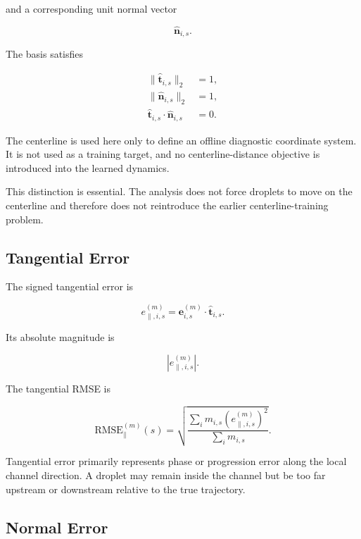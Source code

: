 \documentclass[11pt]{article}
\newcommand{\that}{\hat{\mathbf{t}}}
\newcommand{\nhat}{\hat{\mathbf{n}}}
\begin{document}
and a corresponding unit normal vector

\begin{equation}
\nhat_{i,s}.
\end{equation}

The basis satisfies

\begin{align}
\|\that_{i,s}\|_2 &= 1,\\
\|\nhat_{i,s}\|_2 &= 1,\\
\that_{i,s}\cdot\nhat_{i,s} &= 0.
\end{align}

The centerline is used here only to define an offline diagnostic coordinate system. It is not used as a training target, and no centerline-distance objective is introduced into the learned dynamics.

This distinction is essential. The analysis does not force droplets to move on the centerline and therefore does not reintroduce the earlier centerline-training problem.

\subsection{Tangential Error}

The signed tangential error is

\begin{equation}
e_{\parallel,i,s}^{(m)}
=
\mathbf{e}_{i,s}^{(m)}
\cdot
\that_{i,s}.
\end{equation}

Its absolute magnitude is

\begin{equation}
\left|
e_{\parallel,i,s}^{(m)}
\right|.
\end{equation}

The tangential RMSE is

\begin{equation}
\mathrm{RMSE}_{\parallel}^{(m)}(s)
=
\sqrt{
\frac{
\sum_i m_{i,s}
\left(
e_{\parallel,i,s}^{(m)}
\right)^2
}{
\sum_i m_{i,s}
}
}.
\end{equation}

Tangential error primarily represents phase or progression error along the local channel direction. A droplet may remain inside the channel but be too far upstream or downstream relative to the true trajectory.

\subsection{Normal Error}
\end{document}
